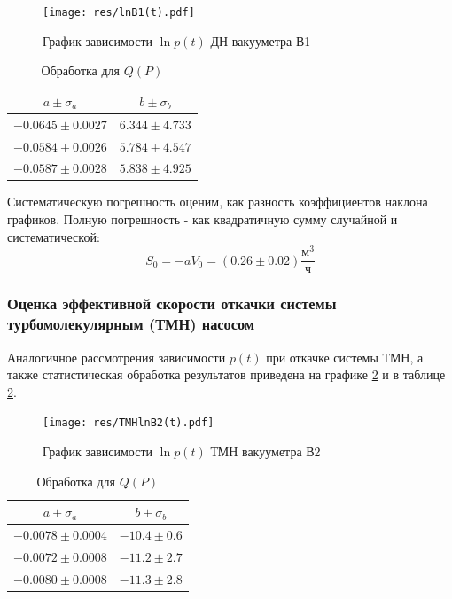 \documentclass[12pt,a4paper]{article}
\begin{document}
	\begin{figure}[H]
		\centering
		\texttt{[image: res/lnB1(t).pdf]}
		\caption{График зависимости $\ln{p}(t)$ ДН вакууметра В1}
		\label{fig:lnB1(t)}
	\end{figure}
	\begin{table}[H]
		
		\caption{Обработка для $Q(P)$}
		\label{tab:lnB1(t)_stat}
		\centering
		\footnotesize
		\begin{tabular}{cc}
			\toprule
			$a \pm \sigma_a$ & $b \pm \sigma_b$ \\
			\midrule
			$-0.0645 \pm 0.0027$     &    $6.344 \pm 4.733$ \\
			$-0.0584 \pm 0.0026$     &    $5.784 \pm 4.547$ \\
			$-0.0587 \pm 0.0028$     &    $5.838 \pm 4.925$ \\
			\bottomrule
		\end{tabular}
	\end{table}
	
	Систематическую погрешность оценим, как разность коэффициентов наклона графиков. Полную погрешность - как квадратичную сумму случайной и систематической:
	$$S_0 = -a V_0 = (0.26 \pm 0.02) \frac{\text{м}^3}{\text{ч}}$$
	
	\subsubsection*{Оценка эффективной скорости откачки системы турбомолекулярным (ТМН) насосом}
	Аналогичное рассмотрения зависимости $p(t)$ при откачке системы ТМН, а также статистическая обработка результатов приведена на графике \ref{fig:TMHlnB2(t)} и в таблице \ref{tab:TMHlnB2(t)}. 
	
	\begin{figure}[H]
		\caption{График зависимости $\ln{p}(t)$ ТМН вакууметра В2}
		\label{fig:TMHlnB2(t)}
		\centering
		\texttt{[image: res/TMHlnB2(t).pdf]}
	\end{figure}
	\begin{table}[H]	
		\caption{Обработка для $Q(P)$}
		\label{tab:TMHlnB2(t)}
		\centering
		\footnotesize
		\begin{tabular}{cc}
			\toprule
			$a \pm \sigma_a$ & $b \pm \sigma_b$ \\
			\midrule
			$-0.0078 \pm 0.0004$     &    $-10.4 \pm 0.6$ \\
			$-0.0072 \pm 0.0008$     &    $-11.2 \pm 2.7$ \\
			$-0.0080 \pm 0.0008$     &    $-11.3 \pm 2.8$ \\
			\bottomrule
		\end{tabular}
	\end{table}
	
\end{document}
